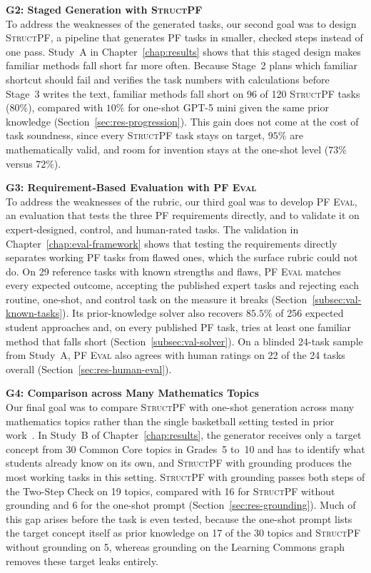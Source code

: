 \textbf{G2: Staged Generation with \textsc{StructPF}}\\[0.2em]
To address the weaknesses of the generated tasks, our second goal was to design \textsc{StructPF}, a pipeline that generates PF tasks in smaller, checked steps instead of one pass. Study~A in Chapter~\ref{chap:results} shows that this staged design makes familiar methods fall short far more often. Because Stage~2 plans which familiar shortcut should fail and verifies the task numbers with calculations before Stage~3 writes the text, familiar methods fall short on 96 of 120 \textsc{StructPF} tasks ($80\%$), compared with $10\%$ for one-shot GPT-5 mini given the same prior knowledge (Section~\ref{sec:res-progression}). This gain does not come at the cost of task soundness, since every \textsc{StructPF} task stays on target, $95\%$ are mathematically valid, and room for invention stays at the one-shot level ($73\%$ versus $72\%$).

\textbf{G3: Requirement-Based Evaluation with \textsc{PF Eval}}\\[0.2em]
To address the weaknesses of the rubric, our third goal was to develop \textsc{PF Eval}, an evaluation that tests the three PF requirements directly, and to validate it on expert-designed, control, and human-rated tasks. The validation in Chapter~\ref{chap:eval-framework} shows that testing the requirements directly separates working PF tasks from flawed ones, which the surface rubric could not do. On 29 reference tasks with known strengths and flaws, \textsc{PF Eval} matches every expected outcome, accepting the published expert tasks and rejecting each routine, one-shot, and control task on the measure it breaks (Section~\ref{subsec:val-known-tasks}). Its prior-knowledge solver also recovers $85.5\%$ of 256 expected student approaches and, on every published PF task, tries at least one familiar method that falls short (Section~\ref{subsec:val-solver}). On a blinded 24-task sample from Study~A, \textsc{PF Eval} also agrees with human ratings on 22 of the 24 tasks overall (Section~\ref{sec:res-human-eval}).

\textbf{G4: Comparison across Many Mathematics Topics}\\[0.2em]
Our final goal was to compare \textsc{StructPF} with one-shot generation across many mathematics topics rather than the single basketball setting tested in prior work~\cite{rahimi2025}. In Study~B of Chapter~\ref{chap:results}, the generator receives only a target concept from 30 Common Core topics in Grades~5 to~10 and has to identify what students already know on its own, and \textsc{StructPF} with grounding produces the most working tasks in this setting. \textsc{StructPF} with grounding passes both steps of the Two-Step Check on 19 topics, compared with 16 for \textsc{StructPF} without grounding and 6 for the one-shot prompt (Section~\ref{sec:res-grounding}). Much of this gap arises before the task is even tested, because the one-shot prompt lists the target concept itself as prior knowledge on 17 of the 30 topics and \textsc{StructPF} without grounding on 5, whereas grounding on the Learning Commons graph removes these target leaks entirely.

